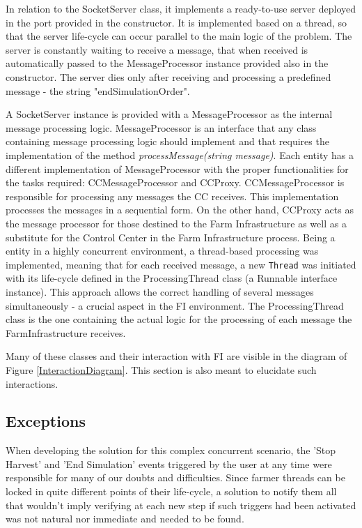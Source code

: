 \documentclass[12pt]{article}
\begin{document}
In relation to the SocketServer class, it implements a ready-to-use server deployed in the port provided in the constructor. 
It is implemented based on a thread, so that the server life-cycle can occur parallel to the main logic of the problem. 
The server is constantly waiting to receive a message, that when received is automatically passed to the MessageProcessor instance provided also in the constructor. 
The server dies only after receiving and processing a predefined message - the string "endSimulationOrder".

A SocketServer instance is provided with a MessageProcessor as the internal message processing logic.
MessageProcessor is an interface that any class containing message processing logic should implement and that requires the implementation of the method 
\textit{processMessage(string message)}. 
Each entity has a different implementation of MessageProcessor with the proper functionalities for the tasks required: CCMessageProcessor and CCProxy.
CCMessageProcessor is responsible for processing any messages the CC receives. 
This implementation processes the messages in a sequential form.
On the other hand, CCProxy acts as the message processor for those destined to the Farm Infrastructure as well as a substitute for the Control Center in the 
Farm Infrastructure process. 
Being a entity in a highly concurrent environment, a thread-based processing was implemented, meaning that for each received message, a new \texttt{Thread} was 
initiated with its life-cycle defined in the ProcessingThread class (a Runnable interface instance). 
This approach allows the correct handling of several messages simultaneously - a crucial aspect in the FI environment. 
The ProcessingThread class is the one containing the actual logic for the processing of each message the FarmInfrastructure receives.

Many of these classes and their interaction with FI are visible in the diagram of Figure \ref{InteractionDiagram}.
This section is also meant to elucidate such interactions.

\subsection{Exceptions} %

When developing the solution for this complex concurrent scenario, the 'Stop Harvest' and 'End Simulation' events triggered by the user at any time were 
responsible for many of our doubts and difficulties.
Since farmer threads can be locked in quite different points of their life-cycle, a solution to notify them all that wouldn't imply verifying at each new step 
if such triggers had been activated was not natural nor immediate and needed to be found.
\end{document}
